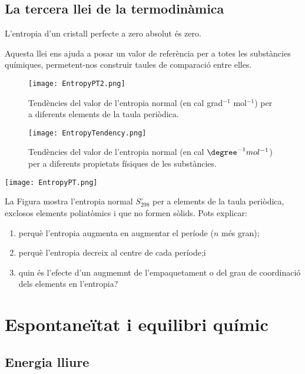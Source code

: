 \subsection{La tercera llei de la termodinàmica}

L'entropia d'un cristall perfecte a zero absolut és zero.

Aquesta llei ens ajuda a posar un valor de referència per a totes les substàncies químiques, permetent-nos construir taules de comparació entre elles. 

\begin{figure}[h]
\centering
\texttt{[image: EntropyPT2.png]}
\caption{Tendències del valor de l'entropia normal (en cal grad$^{-1}$ mol$^{-1}$) per a diferents elements de la taula periòdica.\citep{dickerson_principios_1993}}
\label{fig:EntropyPT2}
\end{figure}

\begin{figure}[h]
\centering
\texttt{[image: EntropyTendency.png]}
\caption{Tendències del valor de l'entropia normal (en cal $\degree ^{-1} mol^{-1}$) per a diferents propietats físiques de les substàncies.\citep{dickerson_principios_1993}}
\label{fig:EntropyTendency}
\end{figure}

\begin{exr}
\begin{center}
\texttt{[image: EntropyPT.png]}
\end{center}

La Figura mostra l'entropia normal $S^{\circ}_{298}$ per a elements de la taula periòdica, exclosos elements poliatòmics i que no formen sòlids.\citep{thoms_periodic_1995} Pots explicar:
\begin{enumerate}
\item perquè l'entropia augmenta en augmentar el període ($n$ més gran);
\item perquè l'entropia decreix al centre de cada període;i
\item quin és l'efecte d'un augmemnt de l'empaquetament o del grau de coordinació dels elements en l'entropia?
\end{enumerate}
\end{exr}

\section{Espontaneïtat i equilibri químic}

\subsection{Energia lliure}

